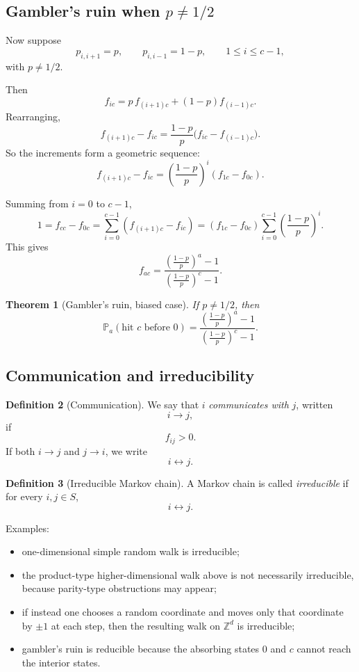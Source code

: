 \documentclass[11pt]{article}
\newtheorem{theorem}{Theorem}[section]
\theoremstyle{definition}
\newtheorem{definition}[theorem]{Definition}
\begin{document}
\subsection{Gambler's ruin when \texorpdfstring{$p\neq 1/2$}{p ≠ 1/2}}

Now suppose
\[
p_{i,i+1}=p,
\qquad
p_{i,i-1}=1-p,
\qquad
1\le i\le c-1,
\]
with \(p\neq 1/2\).

Then
\[
f_{ic}
=
p\,f_{(i+1)c}+(1-p)f_{(i-1)c}.
\]
Rearranging,
\[
f_{(i+1)c}-f_{ic}
=
\frac{1-p}{p}\bigl(f_{ic}-f_{(i-1)c}\bigr).
\]
So the increments form a geometric sequence:
\[
f_{(i+1)c}-f_{ic}
=
\left(\frac{1-p}{p}\right)^i (f_{1c}-f_{0c}).
\]

Summing from \(i=0\) to \(c-1\),
\[
1
=
f_{cc}-f_{0c}
=
\sum_{i=0}^{c-1} (f_{(i+1)c}-f_{ic})
=
(f_{1c}-f_{0c})\sum_{i=0}^{c-1}\left(\frac{1-p}{p}\right)^i.
\]
This gives
\[
f_{ac}
=
\frac{\left(\frac{1-p}{p}\right)^a-1}{\left(\frac{1-p}{p}\right)^c-1}.
\]

\begin{theorem}[Gambler's ruin, biased case]
If \(p\neq 1/2\), then
\[
\mathbb P_a(\text{hit } c \text{ before } 0)
=
\frac{\left(\frac{1-p}{p}\right)^a-1}
{\left(\frac{1-p}{p}\right)^c-1}.
\]
\end{theorem}

\subsection{Communication and irreducibility}

\begin{definition}[Communication]
We say that \(i\) \emph{communicates with} \(j\), written
\[
i\to j,
\]
if
\[
f_{ij}>0.
\]
If both \(i\to j\) and \(j\to i\), we write
\[
i\leftrightarrow j.
\]
\end{definition}

\begin{definition}[Irreducible Markov chain]
A Markov chain is called \emph{irreducible} if for every \(i,j\in S\),
\[
i\leftrightarrow j.
\]
\end{definition}

Examples:
\begin{itemize}[leftmargin=2em]
    \item one-dimensional simple random walk is irreducible;
    \item the product-type higher-dimensional walk above is not necessarily irreducible, because parity-type obstructions may appear;
    \item if instead one chooses a random coordinate and moves only that coordinate by \(\pm 1\) at each step, then the resulting walk on \(\mathbb Z^d\) is irreducible;
    \item gambler's ruin is reducible because the absorbing states \(0\) and \(c\) cannot reach the interior states.
\end{itemize}
\end{document}
